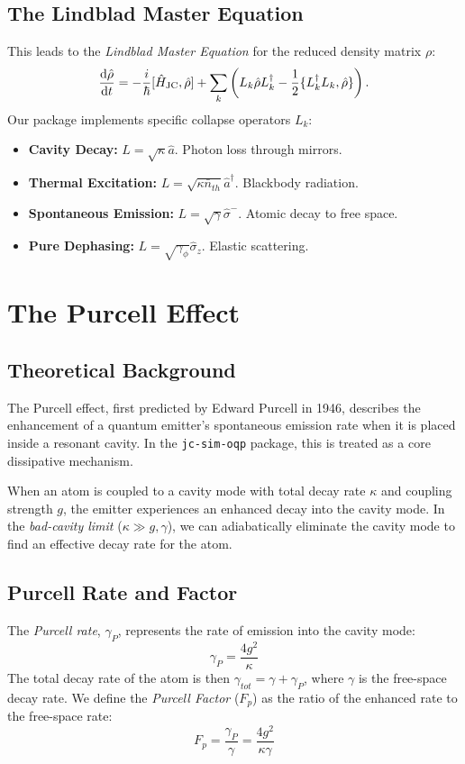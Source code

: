 \documentclass[11pt,a4paper]{article}
\newcommand{\hc}{\hat{a}}
\newcommand{\hcd}{\hat{a}^\dagger}
\newcommand{\sigmam}{\hat{\sigma}^-}
\newcommand{\sigmaz}{\hat{\sigma}_z}
\newcommand{\HJC}{\hat{H}_{\text{JC}}}
\theoremstyle{definition}
\begin{document}
\subsection{The Lindblad Master Equation}
This leads to the \emph{Lindblad Master Equation} for the reduced density matrix $\rho$:
\begin{equation}
  \dv{\hat{\rho}}{t} = -\frac{i}{\hbar}[\HJC, \hat{\rho}] + \sum_k \left( L_k \hat{\rho} L_k^\dagger - \frac{1}{2}\{L_k^\dagger L_k, \hat{\rho}\} \right).
\end{equation}
Our package implements specific collapse operators $L_k$:
\begin{itemize}
    \item \textbf{Cavity Decay:} $L = \sqrt{\kappa}\hc$. Photon loss through mirrors.
    \item \textbf{Thermal Excitation:} $L = \sqrt{\kappa \bar{n}_{th}}\hcd$. Blackbody radiation.
    \item \textbf{Spontaneous Emission:} $L = \sqrt{\gamma}\sigmam$. Atomic decay to free space.
    \item \textbf{Pure Dephasing:} $L = \sqrt{\gamma_\phi}\sigmaz$. Elastic scattering.
\end{itemize}

\section{The Purcell Effect}
\label{sec:purcell}

\subsection{Theoretical Background}
The Purcell effect, first predicted by Edward Purcell in 1946, describes the enhancement of a quantum emitter's spontaneous emission rate when it is placed inside a resonant cavity. In the \texttt{jc-sim-oqp} package, this is treated as a core dissipative mechanism.

When an atom is coupled to a cavity mode with total decay rate $\kappa$ and coupling strength $g$, the emitter experiences an enhanced decay into the cavity mode. In the \emph{bad-cavity limit} ($\kappa \gg g, \gamma$), we can adiabatically eliminate the cavity mode to find an effective decay rate for the atom.

\subsection{Purcell Rate and Factor}
The \emph{Purcell rate}, $\gamma_P$, represents the rate of emission into the cavity mode:
\begin{equation}
    \gamma_P = \frac{4g^2}{\kappa}
\end{equation}
The total decay rate of the atom is then $\gamma_{tot} = \gamma + \gamma_P$, where $\gamma$ is the free-space decay rate. We define the \emph{Purcell Factor} ($F_p$) as the ratio of the enhanced rate to the free-space rate:
\begin{equation}
    F_p = \frac{\gamma_P}{\gamma} = \frac{4g^2}{\kappa \gamma}
\end{equation}
\end{document}

